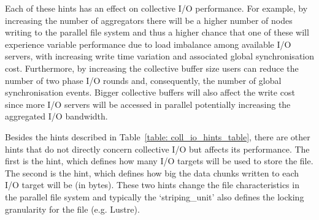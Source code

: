 Each of these hints has an effect on collective I/O performance. For example, by increasing the number of aggregators there will be a higher number of nodes writing to the parallel file system and thus a higher chance that one of these will experience variable performance due to load imbalance among available I/O servers, with increasing write time variation and associated global synchronisation cost. Furthermore, by increasing the collective buffer size users can reduce the number of two phase I/O rounds and, consequently, the number of global synchronisation events. Bigger collective buffers will also affect the write cost since more I/O servers will be accessed in parallel potentially increasing the aggregated I/O bandwidth.

Besides the hints described in Table~\ref{table: coll_io_hints_table}, there are other hints that do not directly concern collective I/O but affects its performance. The first is the  hint, which defines how many I/O targets will be used to store the file. The second is the  hint, which defines how big the data chunks written to each I/O target will be (in bytes). These two hints change the file characteristics in the parallel file system and typically the `striping\_unit' also defines the locking granularity for the file (e.g. Lustre).
